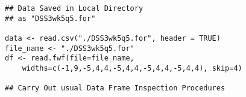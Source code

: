 \documentclass[12pt]{article}
\begin{document}
\begin{framed}
\begin{verbatim}
## Data Saved in Local Directory
## as "DSS3wk5q5.for"

data <- read.csv("./DSS3wk5q5.for", header = TRUE)
file_name <- "./DSS3wk5q5.for"
df <- read.fwf(file=file_name,
    widths=c(-1,9,-5,4,4,-5,4,4,-5,4,4,-5,4,4), skip=4)

## Carry Out usual Data Frame Inspection Procedures
\end{verbatim}	
\end{framed}
\end{document}
